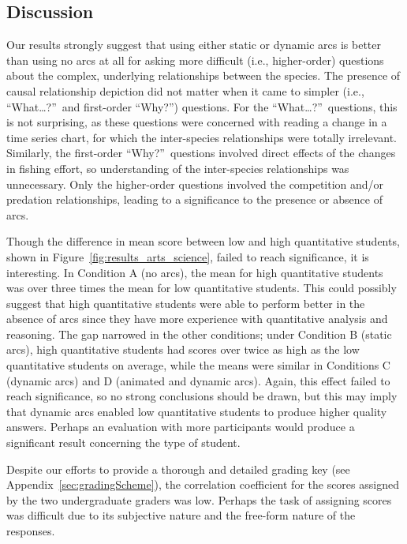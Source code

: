 \subsection{Discussion}

Our results strongly suggest that using either static or dynamic arcs is better than using no arcs at all for asking more difficult (i.e., higher-order) questions about the complex, underlying relationships between the species.  The presence of causal relationship depiction did not matter when it came to simpler (i.e., ``What\ldots?''\ and first-order ``Why?'') questions.  For the ``What\ldots?''\ questions, this is not surprising, as these questions were concerned with reading a change in a time series chart, for which the inter-species relationships were totally irrelevant.  Similarly, the first-order ``Why?''\ questions involved direct effects of the changes in fishing effort, so understanding of the inter-species relationships was unnecessary.  Only the higher-order questions involved the competition and/or predation relationships, leading to a significance to the presence or absence of arcs.

Though the difference in mean score between low and high quantitative students, shown in Figure~\ref{fig:results_arts_science}, failed to reach significance, it is interesting.  In Condition A (no arcs), the mean for high quantitative students was over three times the mean for low quantitative students.  This could possibly suggest that high quantitative students were able to perform better in the absence of arcs since they have more experience with quantitative analysis and reasoning.  The gap narrowed in the other conditions; under Condition B (static arcs), high quantitative students had scores over twice as high as the low quantitative students on average, while the means were similar in Conditions C (dynamic arcs) and D (animated and dynamic arcs).  Again, this effect failed to reach significance, so no strong conclusions should be drawn, but this may imply that dynamic arcs enabled low quantitative students to produce higher quality answers.  Perhaps an evaluation with more participants would produce a significant result concerning the type of student.

Despite our efforts to provide a thorough and detailed grading key (see Appendix~\ref{sec:gradingScheme}), the correlation coefficient for the scores assigned by the two undergraduate graders was low.  Perhaps the task of assigning scores was difficult due to its subjective nature and the free-form nature of the responses.  

